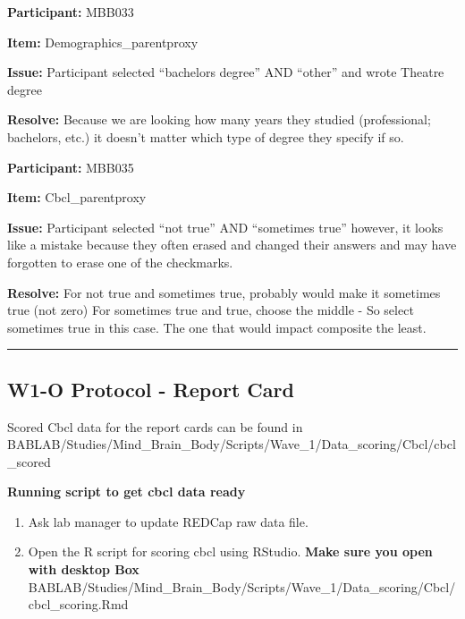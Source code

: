 \documentclass[]{book}
\begin{document}
\textbf{Participant:} MBB033

\textbf{Item:} Demographics\_parentproxy

\textbf{Issue:} Participant selected ``bachelors degree'' AND ``other'' and wrote Theatre degree

\textbf{Resolve:} Because we are looking how many years they studied (professional; bachelors, etc.) it doesn't matter which type of degree they specify if so.

\textbf{Participant:} MBB035

\textbf{Item:} Cbcl\_parentproxy

\textbf{Issue:} Participant selected ``not true'' AND ``sometimes true'' however, it looks like a mistake because they often erased and changed their answers and may have forgotten to erase one of the checkmarks.

\textbf{Resolve:} For not true and sometimes true, probably would make it sometimes true (not zero)
For sometimes true and true, choose the middle - So select sometimes true in this case. The one that would impact composite the least.

\begin{center}\rule{0.5\linewidth}{0.5pt}\end{center}

\hypertarget{w1-o-protocol---report-card}{%
\subsection{W1-O Protocol - Report Card}\label{w1-o-protocol---report-card}}

Scored Cbcl data for the report cards can be found in BABLAB/Studies/Mind\_Brain\_Body/Scripts/Wave\_1/Data\_scoring/Cbcl/cbcl\_scored

\textbf{Running script to get cbcl data ready}

\begin{enumerate}
\def\labelenumi{\arabic{enumi}.}
\item
  Ask lab manager to update REDCap raw data file.
\item
  Open the R script for scoring cbcl using RStudio. \textbf{Make sure you open with desktop Box} BABLAB/Studies/Mind\_Brain\_Body/Scripts/Wave\_1/Data\_scoring/Cbcl/cbcl\_scoring.Rmd
\end{enumerate}
\end{document}
